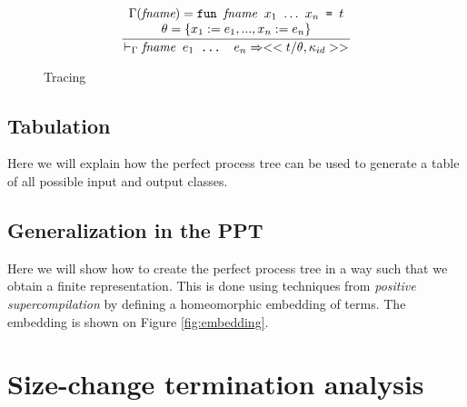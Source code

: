 \documentclass[10pt]{../sigplanconf}
\newcommand{\nfrac}[2]{\frac{\displaystyle{#1}}{\displaystyle{#2}}}
\begin{document}
\begin{figure}
  \begin{equation}
    \nfrac{
      \begin{array}{c}
        \Gamma(\textit{fname}) =
          \texttt{fun \textit{\rmfamily fname} $x_1$ $\ldots$ $x_n$ = $t$} \\
        \theta = \{ x_1 := e_1, ..., x_n := e_n \}
      \end{array}
    }{
      |-_\Gamma \texttt{\textit{\rmfamily fname} $e_1$ ... $e_n$} => <<t / \theta, \kappa_{id}>>
    }
  \end{equation}

  \caption{Tracing}
  \label{fig:tracing}
\end{figure}



\subsection{Tabulation}
Here we will explain how the perfect process tree can be used to
generate a table of all possible input and output classes.

\subsection{Generalization in the PPT}
Here we will show how to create the perfect process tree in a way such
that we obtain a finite representation. This is done using techniques
from \textit{positive supercompilation} by defining a homeomorphic
embedding of terms. The embedding is shown on Figure
\ref{fig:embedding}.

\section{Size-change termination analysis}
\end{document}
